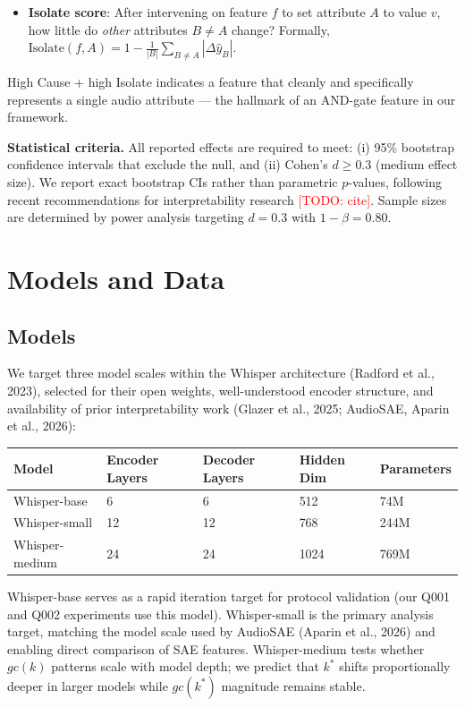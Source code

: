 \documentclass[a4paper]{article}
\begin{document}
\begin{itemize}
\item \textbf{Isolate score}: After intervening on feature $f$ to set attribute $A$ to value $v$, how little do \textit{other} attributes $B \neq A$ change? Formally, $\text{Isolate}(f, A) = 1 - \frac{1}{|B|}\sum_{B \neq A} |\Delta \hat{y}_B|$.
\end{itemize}

High Cause + high Isolate indicates a feature that cleanly and specifically represents a single audio attribute — the hallmark of an AND-gate feature in our framework.

\textbf{Statistical criteria.} All reported effects are required to meet: (i) 95\% bootstrap confidence intervals that exclude the null, and (ii) Cohen's $d \geq 0.3$ (medium effect size). We report exact bootstrap CIs rather than parametric $p$-values, following recent recommendations for interpretability research \textcolor{red}{[TODO: cite]}. Sample sizes are determined by power analysis targeting $d = 0.3$ with $1 - \beta = 0.80$.


\section{Models and Data}

\subsection{Models}

We target three model scales within the Whisper architecture (Radford et al., 2023), selected for their open weights, well-understood encoder structure, and availability of prior interpretability work (Glazer et al., 2025; AudioSAE, Aparin et al., 2026):

\begin{table}[htbp]
\centering
\begin{tabular}{lllll}
\toprule
Model & Encoder Layers & Decoder Layers & Hidden Dim & Parameters \\
\midrule
Whisper-base & 6 & 6 & 512 & 74M \\
Whisper-small & 12 & 12 & 768 & 244M \\
Whisper-medium & 24 & 24 & 1024 & 769M \\
\bottomrule
\end{tabular}
\end{table}

Whisper-base serves as a rapid iteration target for protocol validation (our Q001 and Q002 experiments use this model). Whisper-small is the primary analysis target, matching the model scale used by AudioSAE (Aparin et al., 2026) and enabling direct comparison of SAE features. Whisper-medium tests whether $gc(k)$ patterns scale with model depth; we predict that $k^*$ shifts proportionally deeper in larger models while $gc(k^*)$ magnitude remains stable.
\end{document}
